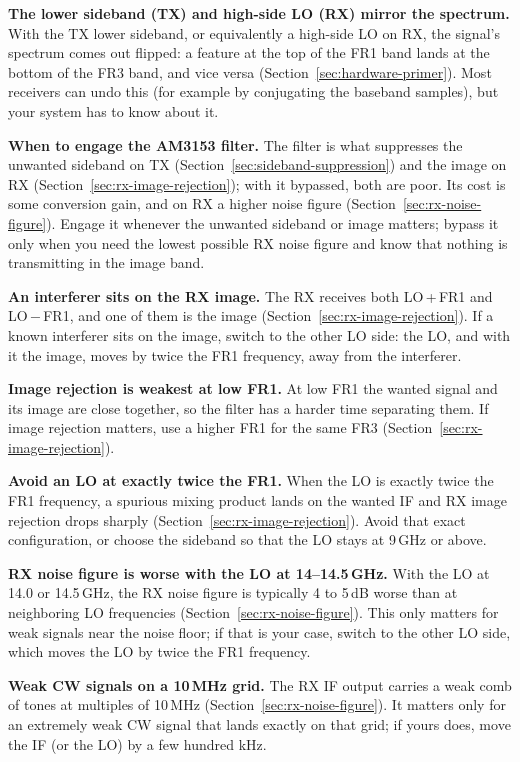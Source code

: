 \textbf{The lower sideband (TX) and high-side LO (RX) mirror the spectrum.} With the TX lower sideband, or equivalently
a high-side LO on RX, the signal's spectrum comes out flipped: a feature at the top of the FR1 band lands at the
bottom of the FR3 band, and vice versa (Section~\ref{sec:hardware-primer}). Most receivers can undo this (for example
by conjugating the baseband samples), but your system has to know about it.

\textbf{When to engage the AM3153 filter.} The filter is what suppresses the unwanted sideband on TX
(Section~\ref{sec:sideband-suppression}) and the image on RX (Section~\ref{sec:rx-image-rejection}); with it
bypassed, both are poor. Its cost is some conversion gain, and on RX a higher noise figure
(Section~\ref{sec:rx-noise-figure}). Engage it whenever the unwanted sideband or image matters; bypass it only when
you need the lowest possible RX noise figure and know that nothing is transmitting in the image band.

\textbf{An interferer sits on the RX image.} The RX receives both LO\,+\,FR1 and LO\,$-$\,FR1, and one of them is
the image (Section~\ref{sec:rx-image-rejection}). If a known interferer sits on the image, switch to the other LO
side: the LO, and with it the image, moves by twice the FR1 frequency, away from the interferer.

\textbf{Image rejection is weakest at low FR1.} At low FR1 the wanted signal and its image are close together, so
the filter has a harder time separating them. If image rejection matters, use a higher FR1 for the same FR3
(Section~\ref{sec:rx-image-rejection}).

\textbf{Avoid an LO at exactly twice the FR1.} When the LO is exactly twice the FR1 frequency, a spurious mixing
product lands on the wanted IF and RX image rejection drops sharply (Section~\ref{sec:rx-image-rejection}). Avoid
that exact configuration, or choose the sideband so that the LO stays at 9\,GHz or above.

\textbf{RX noise figure is worse with the LO at 14--14.5\,GHz.} With the LO at 14.0 or 14.5\,GHz, the RX noise figure
is typically 4 to 5\,dB worse than at neighboring LO frequencies (Section~\ref{sec:rx-noise-figure}). This only
matters for weak signals near the noise floor; if that is your case, switch to the other LO side, which moves the
LO by twice the FR1 frequency.

\textbf{Weak CW signals on a 10\,MHz grid.} The RX IF output carries a weak comb of tones at multiples of 10\,MHz
(Section~\ref{sec:rx-noise-figure}). It matters only for an extremely weak CW signal that lands exactly on that grid;
if yours does, move the IF (or the LO) by a few hundred kHz.

